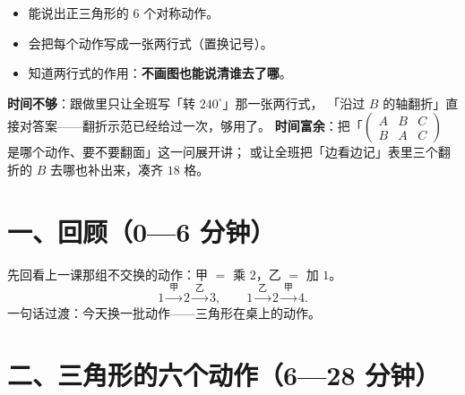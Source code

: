 

\begin{mubiao}
  \begin{itemize}
    \item 能说出正三角形的 \(6\) 个对称动作。
    \item 会把每个动作写成一张两行式（置换记号）。
    \item 知道两行式的作用：\textbf{不画图也能说清谁去了哪}。
  \end{itemize}
\end{mubiao}


\begin{beifen}
  \textbf{时间不够}：跟做里只让全班写「转 \(240^\circ\)」那一张两行式，
  「沿过 \(B\) 的轴翻折」直接对答案——翻折示范已经给过一次，够用了。
  \textbf{时间富余}：把「\(\begin{pmatrix}A&B&C\\B&A&C\end{pmatrix}\) 是哪个动作、要不要翻面」这一问展开讲；
  或让全班把「边看边记」表里三个翻折的 \(B\) 去哪也补出来，凑齐 \(18\) 格。
\end{beifen}

\section*{一、回顾（0—6 分钟）}

先回看上一课那组不交换的动作：甲 \(=\) 乘 \(2\)，乙 \(=\) 加 \(1\)。
\[
  1 \xrightarrow{\ \text{甲}\ } 2 \xrightarrow{\ \text{乙}\ } 3,
  \qquad
  1 \xrightarrow{\ \text{乙}\ } 2 \xrightarrow{\ \text{甲}\ } 4 .
\]
一句话过渡：今天换一批动作——三角形在桌上的动作。

\section*{二、三角形的六个动作（6—28 分钟）}

